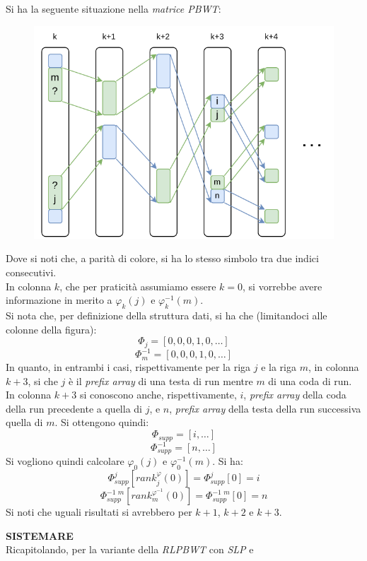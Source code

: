 \begin{esempio}
  Si ha la seguente situazione nella \textit{matrice PBWT}:
  \begin{figure}[H]
    \centering
    \includegraphics[scale = 0.8]{img/phi.pdf}   
  \end{figure}
  Dove si noti che, a parità di colore, si ha lo stesso simbolo tra due indici
  consecutivi. \\
  In colonna $k$, che per praticità assumiamo essere $k=0$, si vorrebbe avere
  informazione in merito a $\varphi_k(j)$ e $\varphi^{-1}_k(m)$. \\
  Si nota che, per definizione della struttura dati, si ha che (limitandoci alle
  colonne della figura):
  \[\varPhi_j=[0,0,0,1,0, \ldots]\]
  \[\varPhi^{-1}_m=[0,0,0,1,0,\ldots]\]
  In quanto, in entrambi i casi, rispettivamente per la riga $j$ e la riga $m$,
  in colonna $k+3$, si che $j$ è il \textit{prefix array} di una testa di run
  mentre $m$ di una coda di run. In colonna $k+3$ si conoscono anche,
  rispettivamente, $i$, \textit{prefix array} della coda della run precedente a
  quella di $j$, e $n$, \textit{prefix array} della testa della run successiva
  quella di $m$. Si ottengono quindi:
  \[\varPhi_{supp}=[i,\ldots]\]
  \[\varPhi^{-1}_{supp}=[n,\ldots]\]
  Si vogliono quindi calcolare $\varphi_0(j)$ e  $\varphi^{-1}_0(m)$. Si ha:
  \[\varPhi_{supp}^j[rank^\varphi_j(0)]=\varPhi_{supp}^j[0]=i\]
  \[\varPhi^{-1\,\,m}_{supp}[rank^{\varphi^{-1}}_m(0)]=\varPhi^{-1\,\,m}_{supp}[0]=n\]
  Si noti che uguali risultati si avrebbero per $k+1$, $k+2$ e $k+3$.
\end{esempio}
\textbf{SISTEMARE}\\
 Ricapitolando, per la variante della \textit{RLPBWT} con \textit{SLP} e

